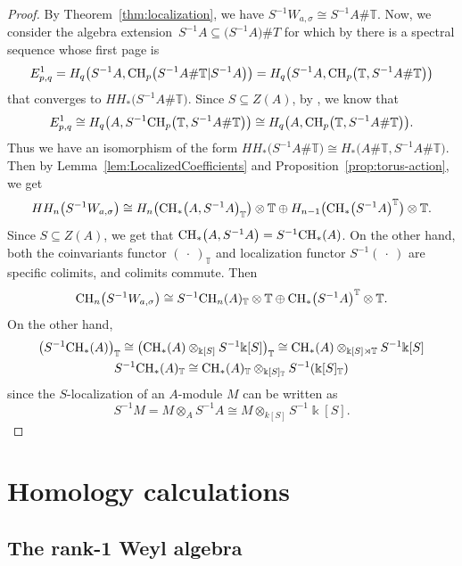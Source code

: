 \documentclass[10pt,a4paper]{amsart}
\newcommand{\B}[1]{\mathbb{#1}}
\newcommand{\CH}{{\rm CH}}
\numberwithin{equation}{section}
\begin{document}
\begin{proof}
 By Theorem~\ref{thm:localization}, we have $S^{-1}W_{a,\sigma} \cong S^{-1}A\# \B{T}$. Now, we
 consider the algebra extension~$S^{-1}A\subseteq \bigl(S^{-1}A\bigr)\# T$ for which by \cite{KaygSutl20}
 there is a spectral sequence whose first page is
 \[ E^1_{p,q} = H_q\bigl(S^{-1}A,\CH_p\bigl(S^{-1}A\# \B{T}|S^{-1}A\bigr)\bigr) = H_q\bigl(S^{-1}A,\CH_p\bigl(\B{T},S^{-1}A\# \B{T}\bigr)\bigr) \]
 that converges to $HH_*\bigl(S^{-1}A\# \B{T}\bigr)$. Since $S\subseteq Z(A)$, by
 \cite{Brylinski:Localizations}, we know that
 \[ E^1_{p,q}\cong H_q\bigl(A,S^{-1}\CH_p\bigl(\B{T}, S^{-1}A\# \B{T}\bigr)\bigr)\cong H_q\bigl(A,\CH_p\bigl(\B{T},S^{-1}A\# \B{T}\bigr)\bigr). \] Thus we have an isomorphism of the form $HH_*\bigl(S^{-1}A\# \B{T}\bigr)\cong
 H_*\bigl(A\# \B{T},S^{-1}A\# \B{T}\bigr)$. Then by Lemma~\ref{lem:LocalizedCoefficients} and Proposition~\ref{prop:torus-action}, we get
 \[ HH_n\bigl(S^{-1}W_{a,\sigma}\bigr)\cong H_n\bigl(\CH_*\bigl(A,S^{-1}A\bigr)_{\B{T}}\bigr)\otimes\B{T} \oplus
 H_{n-1}\bigl(\CH_*\bigl(S^{-1}A\bigr)^{\B{T}}\bigr)\otimes\B{T}.
 \] Since $S\subseteq Z(A)$, we get that $\CH_*\bigl(A,S^{-1}A\bigr) = S^{-1}\CH_*(A)$. On the other hand,
 both the coinvariants functor $(\ \cdot\ )_{\B{T}}$ and localization functor $S^{-1}(\ \cdot\ )$ are
 specific colimits, and colimits commute. Then
 \[ \CH_n\bigl(S^{-1}W_{a,\sigma}\bigr)\cong S^{-1}\CH_n(A)_{\B{T}}\otimes\B{T} \oplus \CH_*\bigl(S^{-1}A\bigr)^{\B{T}}\otimes\B{T}.
 \]
 On the other hand,
 \begin{gather*}
 \bigl(S^{-1}\CH_*(A)\bigr)_{\B{T}} \cong \bigl(\CH_*(A)\otimes_{\Bbbk[S]} S^{-1}\Bbbk[S]\bigr)_{\B{T}} \cong \CH_*(A)\otimes_{\Bbbk[S]\rtimes\B{T}} S^{-1}\Bbbk[S] \\ S^{-1}\CH_*(A)_{\B{T}} \cong \CH_*(A)_{\B{T}}\otimes_{\Bbbk[S]_{\B{T}}} S^{-1}(\Bbbk[S]_{\B{T}})
 \end{gather*}
 since the $S$-localization of an $A$-module $M$ can be written as
 \[ S^{-1}M = M\otimes_A S^{-1}A \cong M\otimes_{k[S]} S^{-1}\Bbbk[S].\tag*{\qed}
 \]\renewcommand{\qed}{}
\end{proof}

\section{Homology calculations}\label{sect:Calculations}

\subsection{The rank-1 Weyl algebra}\label{sect:WeylAlgebra}
\end{document}
